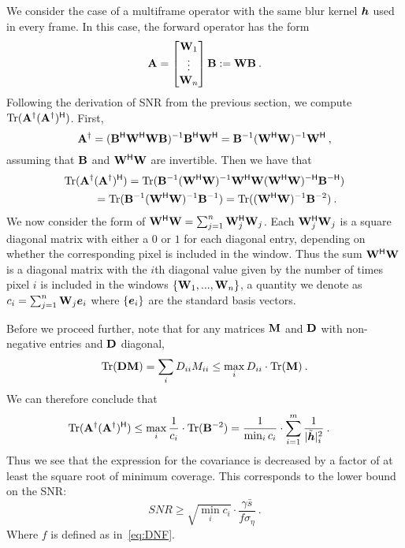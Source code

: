 We consider the case of a multiframe operator with the same blur kernel $\bm{h}$ used in every frame. In this case, the forward operator has the form
\begin{equation*}
\mathbf{A} =  \begin{bmatrix}\mathbf{W}_1 \\ \vdots \\ \mathbf{W}_n \end{bmatrix}\mathbf{B} := \mathbf{W}\mathbf{B}\:.
\end{equation*}
 Following the derivation of SNR from the previous section, we compute $\mathrm{Tr}(\mathbf{A}^\dagger (\mathbf{A}^\dagger)^{\mathsf{H}})$. First,
\[\mathbf{A}^\dagger = (\mathbf{B}^{\mathsf{H}} {\mathbf{W}}^{\mathsf{H}}{\mathbf{W}} \mathbf{B})^{-1} \mathbf{B}^{\mathsf{H}} {\mathbf{W}}^{\mathsf{H}} =
\mathbf{B}^{-1} ({\mathbf{W}}^{\mathsf{H}}{\mathbf{W}} )^{-1} {\mathbf{W}}^{\mathsf{H}}\:,\]
assuming that $\mathbf{B}$ and $\mathbf{W}^{\mathsf{H}} \mathbf{W}$ are invertible.
Then we have that
\begin{align*}
    \mathrm{Tr}(\mathbf{A}^\dagger &(\mathbf{A}^\dagger)^{\mathsf{H}}) = \mathrm{Tr}(\mathbf{B}^{-1} ({\mathbf{W}}^{\mathsf{H}}{\mathbf{W}} )^{-1} {\mathbf{W}}^{\mathsf{H}} {\mathbf{W}} ({\mathbf{W}}^{\mathsf{H}}{\mathbf{W}} )^{-\mathsf{H}}
    \mathbf{B}^{-\mathsf{H}}) \\
    &= \mathrm{Tr}(\mathbf{B}^{-1} ({\mathbf{W}}^{\mathsf{H}}{\mathbf{W}} )^{-1}
    \mathbf{B}^{-1}) = \mathrm{Tr}(({\mathbf{W}}^{\mathsf{H}}{\mathbf{W}} )^{-1} \mathbf{B}^{-2} )\:.
\end{align*}
We now consider the form of ${\mathbf{W}}^{\mathsf{H}}{\mathbf{W}} = \sum_{j=1}^n \mathbf{W}_j^{\mathsf{H}} \mathbf{W}_j$. Each $\mathbf{W}_j^{\mathsf{H}} \mathbf{W}_j$ is a square diagonal matrix with either a $0$ or $1$ for each diagonal entry, depending on whether the corresponding pixel is included in the window. Thus the sum ${\mathbf{W}}^{\mathsf{H}} {\mathbf{W}}$ is a diagonal matrix with the $i$th diagonal value given by the number of times pixel $i$ is included in the windows $\{\mathbf{W}_1,...,\mathbf{W}_n\}$, a quantity we denote as $c_i = \sum_{j=1}^n \mathbf{W}_j \bm{e}_i$ where $\{\bm{e}_i\}$ are the standard basis vectors.

Before we proceed further, note that for any matrices $\mathbf{M}$ and $\mathbf{D}$ with non-negative entries and $\mathbf{D}$ diagonal,
\[\mathrm{Tr}(\mathbf{D}\mathbf{M}) = \sum_{i} D_{ii} M_{ii}  \leq \max_{i} D_{ii} \cdot \mathrm{Tr}(\mathbf{M})\:.\]
We can therefore conclude that
\begin{align*}
    \mathrm{Tr}(\mathbf{A}^\dagger (\mathbf{A}^\dagger)^{\mathsf{H}})&\leq \max_{i}\frac{1}{c_i}\cdot \mathrm{Tr}(\mathbf{B}^{-2})
    =
    \frac{1}{\min_{i} c_i}   \cdot \sum_{i=1}^m \frac{1}{|\tilde {\bm{h}}|_i^2}\:.
\end{align*}
Thus we see that the expression for the covariance is decreased by a factor of at least the square root of minimum coverage. This corresponds to the lower bound on the SNR:
\[SNR \geq \sqrt{{\min_{i} c_i}}\cdot \frac{ \gamma\bar s}{ f \sigma_\eta  }\:.\]
Where $f$ is defined as in~\eqref{eq:DNF}.



